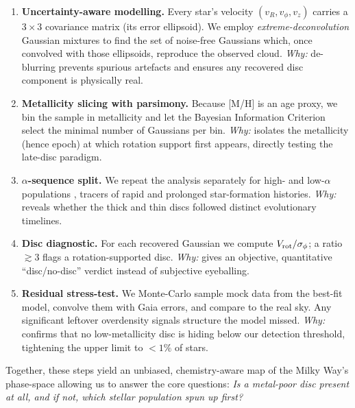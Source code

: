 \documentclass[a4paper,10pt]{article}
\begin{document}
\begin{multicols}{2}
\begin{enumerate}
  \item \textbf{Uncertainty-aware modelling.}  
        Every star’s velocity $(v_R,v_\phi,v_z)$ carries a $3\times3$ covariance
        matrix (its error ellipsoid).  We employ \emph{extreme-deconvolution}
        Gaussian mixtures \cite{Bovy2011,pygmmis} to find the set of
        noise-free Gaussians which, once convolved with those ellipsoids,
        reproduce the observed cloud.  
        \textit{Why:} de-blurring prevents spurious artefacts and ensures any
        recovered disc component is physically real.

  \item \textbf{Metallicity slicing with parsimony.}  
        Because [M/H] is an age proxy, we bin the sample in metallicity and let
        the Bayesian Information Criterion select the minimal number of
        Gaussians per bin.  
        \textit{Why:} isolates the metallicity (hence epoch) at which
        rotation support first appears, directly testing the late-disc
        paradigm.

  \item \textbf{$\alpha$-sequence split.}  
        We repeat the analysis separately for high- and low-$\alpha$
        populations \cite{Vis2024}, tracers of rapid and prolonged
        star-formation histories.  
        \textit{Why:} reveals whether the thick and thin discs followed
        distinct evolutionary timelines.

  \item \textbf{Disc diagnostic.}  
        For each recovered Gaussian we compute $V_{\rm rot}/\sigma_\phi$; a
        ratio $\gtrsim3$ flags a rotation-supported disc.  
        \textit{Why:} gives an objective, quantitative “disc/no-disc” verdict
        instead of subjective eyeballing.

  \item \textbf{Residual stress-test.}  
        We Monte-Carlo sample mock data from the best-fit model, convolve them
        with Gaia errors, and compare to the real sky.  Any significant
        leftover overdensity signals structure the model missed.  
        \textit{Why:} confirms that no low-metallicity disc is hiding below our
        detection threshold, tightening the upper limit to \mbox{$<1\%$} of
        stars.
\end{enumerate}

Together, these steps yield an unbiased, chemistry-aware map of the Milky
Way’s phase-space allowing us to answer the core questions:  
\emph{Is a metal-poor disc present at all, and if not, which stellar population
spun up first?}



\end{multicols}
\end{document}
